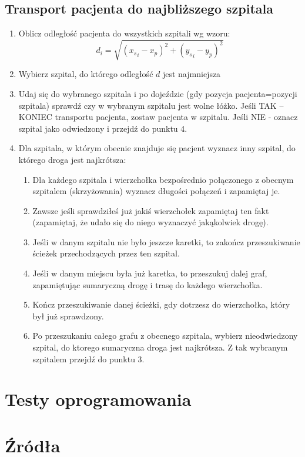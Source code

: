 \documentclass[10pt,a4paper]{article}
\begin{document}
\subsection{Transport pacjenta do najbliższego szpitala}

\begin{enumerate}
    \item Oblicz odległość pacjenta do wszystkich szpitali wg wzoru:
    $$d_i=\sqrt{({x_s}_i-x_p)^2+({y_s}_i-y_p)^2}$$
    \item Wybierz szpital, do którego odległość $d$ jest najmniejsza
    \item Udaj się do wybranego szpitala i po dojeździe (gdy pozycja pacjenta=pozycji szpitala) sprawdź czy w wybranym szpitalu jest wolne łóżko. Jeśli TAK – KONIEC transportu pacjenta, zostaw pacjenta w szpitalu. Jeśli NIE - oznacz szpital jako odwiedzony i przejdź do punktu 4.
    \item Dla szpitala, w którym obecnie znajduje się pacjent wyznacz inny szpital, do którego droga jest najkrótsza:
    \begin{enumerate}[4.1.]
        \item Dla każdego szpitala i wierzchołka bezpośrednio połączonego z obecnym szpitalem (skrzyżowania) wyznacz długości połączeń i zapamiętaj je.
        \item Zawsze jeśli sprawdziłeś już jakiś wierzchołek zapamiętaj ten fakt (zapamiętaj, że udało się do niego wyznaczyć jakąkolwiek drogę).
        \item Jeśli w danym szpitalu nie było jeszcze karetki, to zakończ przeszukiwanie ścieżek przechodzących przez ten szpital.
        \item Jeśli w danym miejscu była już karetka, to przeszukuj dalej graf, zapamiętując sumaryczną drogę i trasę do każdego wierzchołka.
        \item Kończ przeszukiwanie danej ścieżki, gdy dotrzesz do wierzchołka, który był już sprawdzony.
        \item Po przeszukaniu całego grafu z obecnego szpitala, wybierz nieodwiedzony szpital, do ktorego sumaryczna droga jest najkrótsza. Z tak wybranym szpitalem przejdź do punktu 3. 
        
    \end{enumerate}
\end{enumerate}

\section{Testy oprogramowania}


\section{Źródła}
\end{document}
